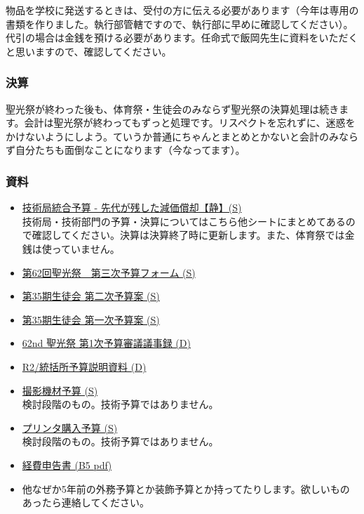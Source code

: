 \documentclass[dvipdfmx,jb5]{jarticle}
\begin{document}
物品を学校に発送するときは、受付の方に伝える必要があります（今年は専用の書類を作りました。執行部管轄ですので、執行部に早めに確認してください）。代引の場合は金銭を預ける必要があります。任命式で飯岡先生に資料をいただくと思いますので、確認してください。

\subsubsection{決算}
聖光祭が終わった後も、体育祭・生徒会のみならず聖光祭の決算処理は続きます。会計は聖光祭が終わってもずっと処理です。リスペクトを忘れずに、迷惑をかけないようにしよう。ていうか普通にちゃんとまとめとかないと会計のみならず自分たちも面倒なことになります（今なってます）。

\subsubsection{資料}
\begin{itemize}
  \item \href{https://docs.google.com/spreadsheets/d/1cCHlfuN5FRR4mlCLDqwohB5WyJ2stmBoUM762DVa7aM/edit##gid=848718781}{技術局統合予算 - 先代が残した減価償却【静】(S)}
  \\ 技術局・技術部門の予算・決算についてはこちら他シートにまとめてあるので確認してください。決算は決算終了時に更新します。また、体育祭では金銭は使っていません。
  \item \href{https://docs.google.com/spreadsheets/d/1Tg_4jKLywMSQpIjNebaPKgTH9YmPqoLZAOGBRs1sr7I/edit?usp=sharing}{第62回聖光祭　第三次予算フォーム (S)}
  \item \href{https://docs.google.com/spreadsheets/d/1zZcA076Hvox9dDIvhHAMnmiIAQI0af1ChN1slH4WyVw/edit?usp=sharing}{第35期生徒会 第二次予算案 (S)}
  \item \href{https://docs.google.com/spreadsheets/d/1uNOAvcq1S3ErZTklh8G7kT6zPYlna-8pR9Jqv2RYYKc/edit?usp=sharing}{第35期生徒会 第一次予算案 (S)}
  \item \href{https://docs.google.com/document/d/1hR_gEl9qHiXGgSxzFDBNH7U6hyPKhjvPEHOStIhGmo8/edit?usp=sharing}{62nd 聖光祭 第1次予算審議議事録 (D)}
  \item \href{https://docs.google.com/document/d/1brt8Fwv7bYzFQlV_zTF3Tmtmhg8zD4gGt-oBMQM-7Iw/edit?usp=sharing}{R2/統括所予算説明資料 (D)}
  \item \href{https://docs.google.com/spreadsheets/d/1tlZiJdgfzjbsGDRE5cx0bnHmj2DNoOukDPuPQMx2N5g/edit?usp=sharing}{撮影機材予算 (S)}
  \\検討段階のもの。技術予算ではありません。
  \item \href{https://docs.google.com/spreadsheets/d/1-HWo9Lh8epNt7tHbg88feTvWC146bmrN0XXh0YFmPzU/edit?usp=sharing}{プリンタ購入予算 (S)}
  \\検討段階のもの。技術予算ではありません。
  \item \href{https://drive.google.com/file/d/1TN5O2NX7dg8xD_-Y-93Du-caYc1XWezX/view?usp=sharing}{経費申告書 (B5 pdf)}
  \item 他なぜか5年前の外務予算とか装飾予算とか持ってたりします。欲しいものあったら連絡してください。
\end{itemize}
\end{document}
